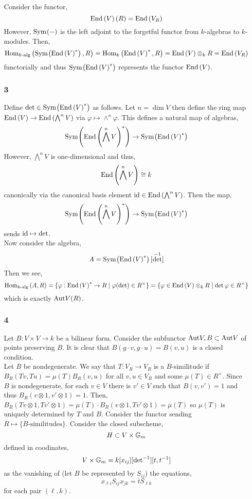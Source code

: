 \documentclass[12pt]{article}
\begin{document}
Consider the functor,
\[ \mathrm{End}\left( V \right)(R) = \mathrm{End}\left( V_R \right) \]
However, $\mathrm{Sym}_{}\! \left( - \right)$ is the left adjoint to the forgetful functor from $k$-algebras to $k$-modules. Then,
\[ \mathrm{Hom}_{k\text{-alg}} \left( \mathrm{Sym}_{}\! \left( \mathrm{End}\left( V \right)^* \right), R \right) = \mathrm{Hom}_{k} \left( \mathrm{End}\left( V \right)^*, R \right) = \mathrm{End}\left( V \right) \otimes_k R = \mathrm{End}\left( V_R \right) \]
functorially and thus $\mathrm{Sym}_{}\! \left( \mathrm{End}\left( V \right)^* \right)$ represents the functor $\mathrm{End}\left( V \right)$.

\subsubsection{3}

Define $\det \in \mathrm{Sym}_{}\! \left( \mathrm{End}\left( V \right)^* \right)$ as follows. Let $n = \dim{V}$ then define the ring map $\mathrm{End}\left( V \right) \to \mathrm{End}\left( \bigwedge^n V \right)$ via $\varphi \mapsto \wedge^n \varphi$. This defines a natural map of algebras,
\[ \mathrm{Sym}_{}\! \left( \mathrm{End}\left( \bigwedge^n V \right)^* \right) \to \mathrm{Sym}_{}\! \left( \mathrm{End}\left( V \right)^* \right) \]
However, $\bigwedge^n V$ is one-dimensional and thus,
\[ \mathrm{End}\left( \bigwedge^n V \right) \cong k \]
canonically via the canonical basis element $\mathrm{id} \in \mathrm{End}\left( \bigwedge^n V \right)$. Then the map,
\[ \mathrm{Sym}_{}\! \left( \mathrm{End}\left( \bigwedge^n V \right)^* \right) \to \mathrm{Sym}_{}\! \left( \mathrm{End}\left( V \right)^* \right) \]
sends $\mathrm{id} \mapsto \det$.
\bigskip\\
Now consider the algebra,
\[ A = \mathrm{Sym}_{}\! \left( \mathrm{End}\left( V \right)^* \right)[\det^{-1}] \]
Then we see,
\[ \mathrm{Hom}_{k\text{-alg}} \left( A, R \right) = \{ \varphi : \mathrm{End}\left( V \right)^* \to R \mid \varphi(\det) \in R^\times \} = \{ \varphi \in \mathrm{End}\left( V \right) \otimes_k R \mid \det{\varphi} \in R^\times \} \]
which is exactly $\mathrm{Aut}{V}(R)$.

\subsubsection{4}

Let $B : V \times V \to k$ be a bilinear form. Consider the subfunctor $\mathrm{Aut}{V,B} \subset \mathrm{Aut}{V}$ of points preserving $B$. It is clear that $B(g \cdot v, g \cdot u) = B(v,u)$ is a closed condition.
\bigskip\\
Let $B$ be nondegenerate. We say that $T : V_R \to V_R$ is a $B$-similitude if $B_R(T v, T u) = \mu(T) B_R(v,u)$ for all $v,u \in V_R$ and some $\mu(T) \in R^\times$. Since $B$ is nondegenerate, for each $v \in V$ there is $v' \in V$ such that $B(v,v') = 1$ and thus $B_R(v \otimes 1, v' \otimes 1) = 1$. Then, $B_R(T v \otimes 1, T v' \otimes 1) = \mu(T) \cdot B_R(v \otimes 1, T v' \otimes 1) = \mu(T)$ so $\mu(T)$ is uniquely determined by $T$ and $B$. Consider the functor sending $R \mapsto \{ B\text{-similitudes} \}$. Consider the closed subscheme,
\[ H \subset {}{V} \times \mathbb{G}_m \]
defined in coodinates,
\[ {}{V} \times \mathbb{G}_m = k[x_{ij}][\mathrm{det}^{-1}][t, t^{-1}] \]
as the vanishing of (let $B$ be represented by $S_{ij}$) the equations,
\[ x_{\ell i} S_{ij} x_{jk} = t S_{\ell k} \]
for each pair $(\ell, k)$.
\end{document}
